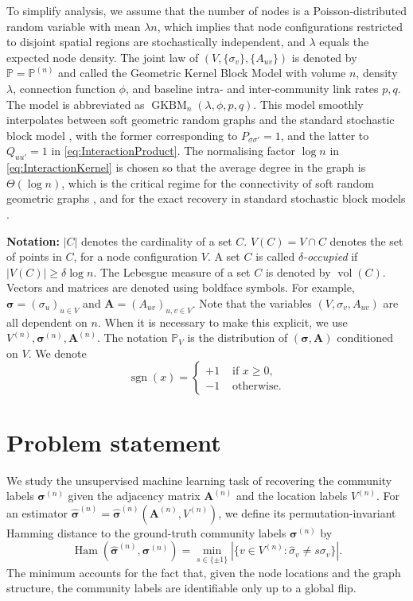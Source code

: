 \documentclass[letterpaper,11pt]{article}
\theoremstyle{definition}
\def\P{\mathbb{P}}
\def\bA{\bm{A}}
\newcommand{\hsigma}{\hat{\sigma}}
\newcommand{\bsigma}{\bm{\sigma}}
\newcommand{\hbsigma}{\hat{\bsigma}}
\newcommand{\sign}{\operatorname{sgn}}
\newcommand{\volume}{\operatorname{vol}}
\numberwithin{equation}{section}
\newcommand{\GKBM}{\operatorname{GKBM}}
\newcommand{\la}{\lambda}
\newcommand{\Ham}{\operatorname{Ham}}
\theoremstyle{definition}
\def\P{\mathbb{P}}
\def\bA{\bm{A}}
\newcommand{\hsigma}{\hat{\sigma}}
\newcommand{\bsigma}{\bm{\sigma}}
\newcommand{\hbsigma}{\hat{\bsigma}}
\newcommand{\sign}{\operatorname{sgn}}
\newcommand{\volume}{\operatorname{vol}}
\numberwithin{equation}{section}
\newcommand{\GKBM}{\operatorname{GKBM}}
\newcommand{\la}{\lambda}
\newcommand{\Ham}{\operatorname{Ham}}
\theoremstyle{thmstyletwo}%
\begin{document}
To simplify analysis, we assume that the number of nodes is a Poisson-distributed
random variable with mean $\la n$, which implies that
node configurations restricted to disjoint spatial regions are stochastically independent,
and $\la$ equals the expected node density.
The joint law of $(V, \{\sigma_v\}, \{A_{uv}\})$ is denoted by $\P = \P^{(n)}$
and called the
Geometric Kernel Block Model
with  volume $n$, density $\la$, connection function $\phi$, and baseline intra- and inter-community link rates $p,q$.
The model is abbreviated as $\GKBM_n(\la, \phi, p, q)$.
This model smoothly interpolates between
soft geometric random graphs \cite{penrose2016connectivity} and
the standard stochastic block model \cite{abbe2017community},
with the former corresponding to $P_{\sigma \sigma'} = 1$,
and the latter to $Q_{uu'} = 1$ in \eqref{eq:InteractionProduct}.
The normalising factor $\log n$ in \eqref{eq:InteractionKernel} is chosen
so that the average degree in the graph is $\Theta(\log n)$,
which is the critical regime for the connectivity of soft random geometric graphs \cite{penrose2016connectivity,wilsherConnectivityOnedimensionalSoft2020,Wilsher_Dettmann_Ganesh_2023},
and for the exact recovery in standard stochastic block models
\cite{abbe2015exact,Mossel_Neeman_Sly_2016}.

\textbf{Notation:} $|C|$ denotes the cardinality of a set $C$.
$V(C) = V \cap C$ denotes the set of points in $C$, for a node configuration $V$.
A set $C$ is called \emph{$\delta$-occupied} if $|V(C)| \ge \delta \log n$. The Lebesgue measure of a set $C$ is denoted by $\volume(C)$.
Vectors and matrices are denoted using boldface symbols.
For example, $\bsigma=(\sigma_u)_{u \in V}$ and $\bA = (A_{uv})_{u,v\in V}$. Note that the variables $(V,\sigma_v,A_{uv})$ are all dependent on $n$.
When it is necessary to make this explicit, we use $V^{(n)}, \bsigma^{(n)}, \bA^{(n)}$. The notation $\P_V$ is the distribution of $(\bsigma,\bA)$ conditioned on $V$.
We denote
\[
\sign(x) = \begin{cases}
    +1 & \text{ if } x\ge 0, \\
    -1 & \text{ otherwise}.
\end{cases}
\]

\section{Problem statement}
\label{sec:prob_stat}
We study the unsupervised machine learning task of
recovering the community labels $\bsigma^{(n)}$ given the adjacency matrix $\bA^{(n)}$ and the location labels $V^{(n)}$.
For an estimator $\hat{\bsigma}^{(n)} = \hat{\bsigma}^{(n)}(\bA^{(n)}, V^{(n)})$, we define its permutation-invariant
Hamming distance
to
the ground-truth
community labels $\bsigma^{(n)}$
by
\begin{equation}
 \Ham(\hbsigma^{(n)},\bsigma^{(n)})
 = \min_{s \in \{\pm 1\}} |\{v\in V^{(n)} \colon \hsigma_v \ne s \sigma_v\}|.
 \label{eq:Hamming_dist}
\end{equation}
The minimum accounts for the fact that, given the node locations and the graph structure, the community labels are identifiable only up to a global flip.
\end{document}
